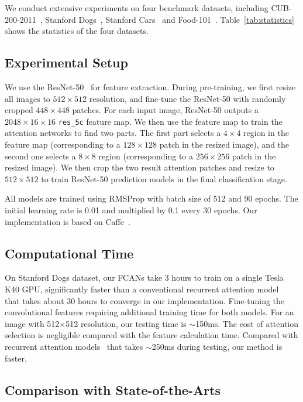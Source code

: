 \documentclass[10pt,twocolumn,letterpaper]{article}
\begin{document}
We conduct extensive experiments on four benchmark datasets, including CUB-200-2011~\cite{wah2011caltech}, Stanford Dogs~\cite{khosla2011novel}, Stanford Cars~\cite{krause20133d}  and Food-101~\cite{bossard2014food}.
Table~\ref{tab:statistics} shows the statistics of the four datasets.

\subsection{Experimental Setup}
We use the ResNet-50~\cite{he2016deep} for feature extraction. During pre-training, we first resize all images to $512 \times512 $ resolution, and fine-tune the ResNet-50 with randomly cropped $448\times448$ patches.
For each input image, ResNet-50 outputs a $2048\times16\times16$ \texttt{res\_5c} feature map.
We then use the feature map to train the attention networks to find two parts.
The first part selects a $4\times4$ region in the feature map (corresponding to a $128\times128$ patch in the resized image), and the second one selects a $8\times8$ region (corresponding to a $256\times256$ patch in the resized image).
We then crop the two result attention patches and resize to $512\times512$ to train ResNet-50 prediction models in the final classification stage.

All models are trained using RMSProp with batch size of 512 and 90 epochs.
The initial learning rate is 0.01 and multiplied by 0.1 every 30 epochs.
Our implementation is based on Caffe~\cite{jia2014caffe}. 

\subsection{Computational Time}

On Stanford Dogs dataset, our FCANs take 3 hours to train on a single Tesla K40 GPU, significantly faster than a conventional recurrent attention model~\cite{sermanet2014attention} that takes about 30 hours to converge in our implementation. 
Fine-tuning the convolutional features requiring additional training time for both models. 
For an image with 512$\times$512 resolution, our testing time is $\sim$150ms. 
The cost of attention selection is negligible compared with the feature calculation time.
Compared with recurrent attention models~\cite{sermanet2014attention} that takes $\sim$250ms during testing, our method is faster.

\subsection{Comparison with State-of-the-Arts}
\end{document}
